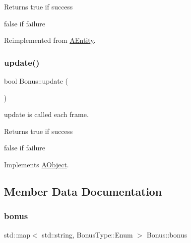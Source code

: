 \begin{DoxyReturn}{Returns}
true if success 

false if failure 
\end{DoxyReturn}


Reimplemented from \hyperlink{class_a_entity_ae2faa1d11e21033a223fef2bc03b9338}{A\+Entity}.

\mbox{\label{class_bonus_a0dd8aa4474c3d1ef494ed8a916cc16cd}} 
\subsubsection{\texorpdfstring{update()}{update()}}
{\footnotesize\ttfamily bool Bonus\+::update (\begin{DoxyParamCaption}{ }\end{DoxyParamCaption})\hspace{0.3cm}{\ttfamily [virtual]}}



update is called each frame. 

\begin{DoxyReturn}{Returns}
true if success 

false if failure 
\end{DoxyReturn}


Implements \hyperlink{class_a_object_af35bb4b68af0a11bb1fcf617bde41ecd}{A\+Object}.



\subsection{Member Data Documentation}
\mbox{\label{class_bonus_a44ca4e53cfd07e7a1c3cfac191fdf624}} 
\subsubsection{\texorpdfstring{bonus}{bonus}}
{\footnotesize\ttfamily std\+::map$<$ std\+::string, Bonus\+Type\+::\+Enum $>$ Bonus\+::bonus\hspace{0.3cm}{\ttfamily [static]}}

